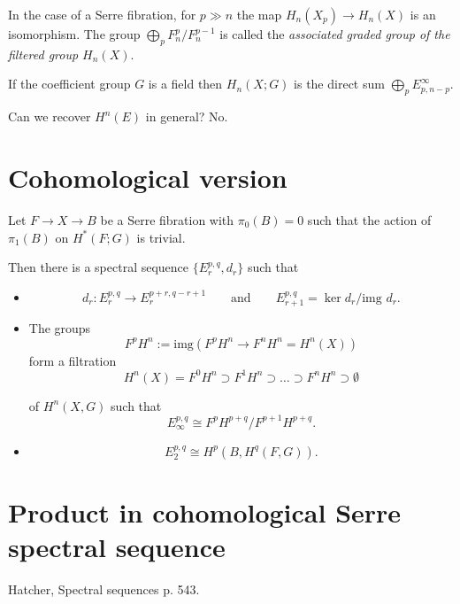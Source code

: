 \begin{remark}
\label{remark-case-serre-fibra-p-n-map}
	In the case of a Serre fibration, for $p\gg
	n$ the map $H_{n}(X_p)\to H_{n}(X)$ is an
	isomorphism. The group
	$\bigoplus_{p}F^p_n/F^{p-1}_n$ is called the
	{\it associated graded group of the filtered
	group $H_n(X)$}.
\end{remark}

\begin{remark}
\label{remark-quote-from-hatcher}
	If the coefficient group $G$ is a field then
	$H_{n}(X;G)$ is the direct sum
	$\bigoplus_{p} E^\infty_{p,n-p}$.
\end{remark}

\begin{remark}
\label{remark-can-we-recov-h-n-e-gener}
	Can we recover $H^{n}(E)$ in general? No.
\end{remark}

\section{Cohomological version}
\label{section-cohomological-version}

\begin{theorem}
\label{theorem-serre-spect-seque-cohom}
	Let $F\to X\to B$ be a Serre fibration with
	$\pi_0(B)=0$ such that the action of
	$\pi_1(B)$ on $H^*(F;G)$ is trivial.

	Then there is a spectral sequence
	$\{E_r^{p,q},d_r\}$ such that
\begin{itemize}
	\item $$d_r:E_r^{p,q}\to
	E_r^{p+r,q-r+1}\qquad\text{and} \qquad
	E_{r+1}^{p,q}=\ker d_r/\text{img }d_r.$$
	\item The groups
		$$F^pH^n:=\text{img} (F^pH^n\to
		F^nH^n=H^n(X))$$
	form a filtration
	$$H^{n}(X)=F^0H^n\supset F^1H^n\supset
	\ldots\supset F^nH^n\supset \emptyset $$

	of $H^{n}(X,G)$ such that
	$$E_{\infty}^{p,q}\cong
	F^pH^{p+q}/F^{p+1}H^{p+q}.$$
\item $$E^{p,q}_2\cong H^p(B,H^{q}(F,G)).$$
\end{itemize}
\end{theorem}

\section{Product in cohomological Serre
spectral sequence}
\label{section-produ-cohom-serre-spect}
Hatcher, Spectral sequences p. 543.

